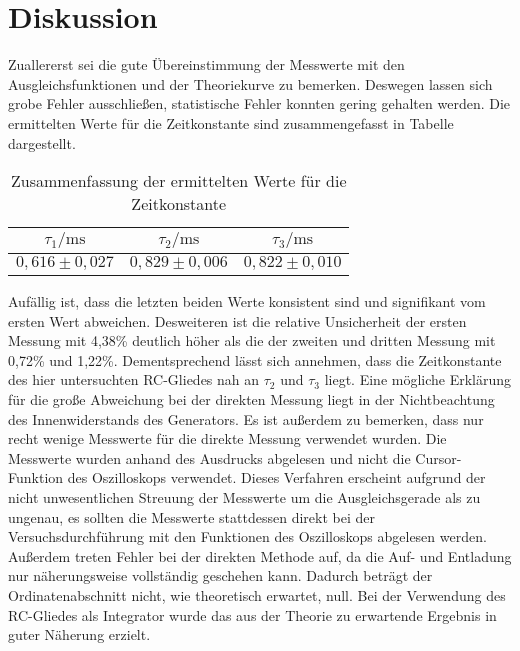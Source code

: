 \section{Diskussion}
\label{sec:Diskussion}
Zuallererst sei die gute Übereinstimmung der Messwerte mit den Ausgleichsfunktionen
und der Theoriekurve zu bemerken. Deswegen lassen sich grobe Fehler ausschließen,
statistische Fehler konnten gering gehalten werden.
Die ermittelten Werte für die Zeitkonstante sind zusammengefasst in Tabelle
dargestellt.

\begin{table}
\centering
\begin{tabular}{ccc}
\toprule
$\tau_1 / \si{\milli \second}$ & $\tau_2 / \si{\milli \second}$ & $\tau_3 / \si{\milli \second}$\\
\midrule
$0,616 \pm 0,027$ & $0,829 \pm 0,006$ & $0,822 \pm 0,010$\\
\bottomrule
\end{tabular}
\caption{Zusammenfassung der ermittelten Werte für die Zeitkonstante}
\end{table}

Aufällig ist, dass die letzten beiden Werte konsistent sind und signifikant vom
ersten Wert abweichen. Desweiteren ist die relative Unsicherheit der ersten Messung mit
4,38\% deutlich höher als die der zweiten und dritten Messung mit 0,72\% und 1,22\%.
Dementsprechend lässt sich annehmen, dass die Zeitkonstante des hier untersuchten
RC-Gliedes nah an $\tau_2$ und $\tau_3$ liegt.
Eine mögliche Erklärung für die große Abweichung bei der direkten Messung liegt
in der Nichtbeachtung des Innenwiderstands des Generators. Es ist außerdem zu bemerken,
dass nur recht wenige Messwerte für die direkte Messung verwendet wurden. Die Messwerte
wurden anhand des Ausdrucks abgelesen und nicht die Cursor-Funktion des Oszilloskops verwendet.
Dieses Verfahren erscheint aufgrund der nicht unwesentlichen Streuung der Messwerte um die
Ausgleichsgerade als zu ungenau, es sollten die Messwerte stattdessen direkt bei der
Versuchsdurchführung mit den Funktionen des Oszilloskops abgelesen werden.
Außerdem treten Fehler bei der direkten Methode auf, da die Auf- und Entladung nur
näherungsweise vollständig geschehen kann. Dadurch beträgt der Ordinatenabschnitt nicht,
wie theoretisch erwartet, null.
Bei der Verwendung des RC-Gliedes als Integrator wurde das aus der Theorie zu erwartende Ergebnis
in guter Näherung erzielt.

